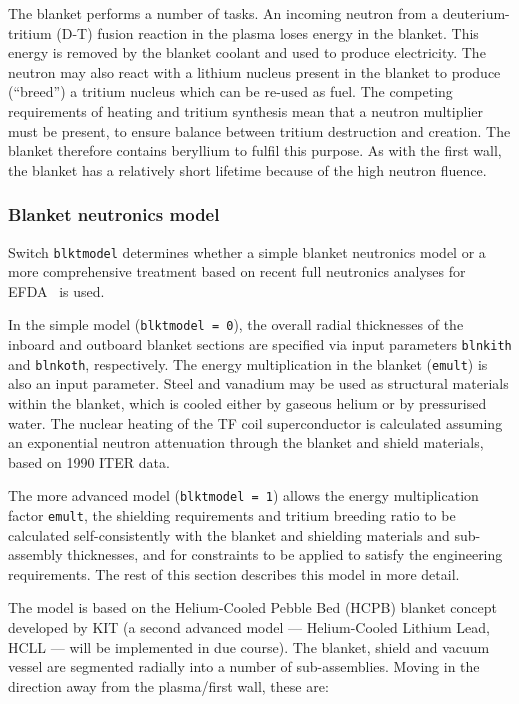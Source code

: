 \documentclass[11pt,a4paper]{report}
\begin{document}
The blanket performs a number of tasks. An incoming neutron from a
deuterium-tritium (D-T) fusion reaction in the plasma loses energy in the
blanket. This energy is removed by the blanket coolant and used to produce
electricity. The neutron may also react with a lithium nucleus present in the
blanket to produce (``breed'') a tritium nucleus which can be re-used as
fuel. The competing requirements of heating and tritium synthesis mean that a
neutron multiplier must be present, to ensure balance between tritium
destruction and creation. The blanket therefore contains beryllium to fulfil
this purpose. As with the first wall, the blanket has a relatively short
lifetime because of the high neutron fluence.

\subsubsection{Blanket neutronics model}
\label{sec:blanket_neutronics}

Switch \texttt{blktmodel} determines whether a simple blanket neutronics model
or a more comprehensive treatment based on recent full neutronics analyses for
EFDA~\cite{efda_blanket_model} is used.

In the simple model (\texttt{blktmodel = 0}), the overall radial thicknesses
of the inboard and outboard blanket sections are specified via input
parameters \texttt{blnkith} and \texttt{blnkoth}, respectively. The energy
multiplication in the blanket (\texttt{emult}) is also an input
parameter. Steel and vanadium may be used as structural materials within the
blanket, which is cooled either by gaseous helium or by pressurised water. The
nuclear heating of the TF coil superconductor is calculated assuming an
exponential neutron attenuation through the blanket and shield materials,
based on 1990 ITER data.

The more advanced model (\texttt{blktmodel = 1}) allows the energy
multiplication factor \texttt{emult}, the shielding requirements and tritium
breeding ratio to be calculated self-consistently with the blanket and
shielding materials and sub-assembly thicknesses, and for constraints to be
applied to satisfy the engineering requirements. The rest of this section
describes this model in more detail.

The model is based on the Helium-Cooled Pebble Bed (HCPB) blanket concept
developed by KIT (a second advanced model --- Helium-Cooled Lithium Lead, HCLL
--- will be implemented in due course). The blanket, shield and vacuum vessel
are segmented radially into a number of sub-assemblies. Moving in the
direction away from the plasma/first wall, these are:
\end{document}
